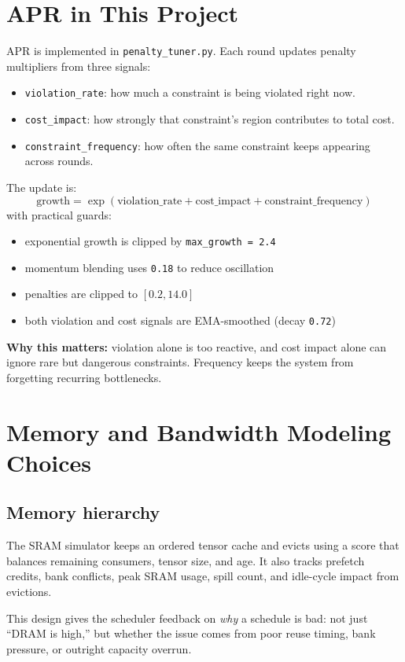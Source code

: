 \documentclass[11pt]{article}
\begin{document}
\section{APR in This Project}
APR is implemented in \texttt{penalty\_tuner.py}. Each round updates penalty multipliers from three signals:
\begin{itemize}
    \item \texttt{violation\_rate}: how much a constraint is being violated right now.
    \item \texttt{cost\_impact}: how strongly that constraint's region contributes to total cost.
    \item \texttt{constraint\_frequency}: how often the same constraint keeps appearing across rounds.
\end{itemize}

The update is:
\[
\text{growth} = \exp(\text{violation\_rate} + \text{cost\_impact} + \text{constraint\_frequency})
\]
with practical guards:
\begin{itemize}
    \item exponential growth is clipped by \texttt{max\_growth = 2.4}
    \item momentum blending uses \texttt{0.18} to reduce oscillation
    \item penalties are clipped to \([0.2, 14.0]\)
    \item both violation and cost signals are EMA-smoothed (decay \texttt{0.72})
\end{itemize}

\textbf{Why this matters:} violation alone is too reactive, and cost impact alone can ignore rare but dangerous constraints. Frequency keeps the system from forgetting recurring bottlenecks.

\section{Memory and Bandwidth Modeling Choices}
\subsection*{Memory hierarchy}
The SRAM simulator keeps an ordered tensor cache and evicts using a score that balances remaining consumers, tensor size, and age. It also tracks prefetch credits, bank conflicts, peak SRAM usage, spill count, and idle-cycle impact from evictions.

This design gives the scheduler feedback on \emph{why} a schedule is bad: not just ``DRAM is high,'' but whether the issue comes from poor reuse timing, bank pressure, or outright capacity overrun.
\end{document}
